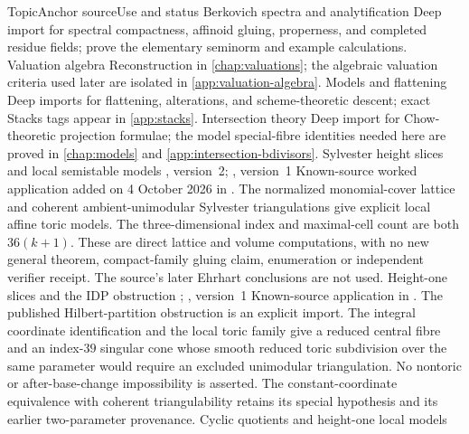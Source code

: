\begin{AppLProvenanceLedger}{Topic}{Anchor source}{Use and status}
\AppLProvenanceRecord
  {Berkovich spectra and analytification}
  {\cite{Berk12}}
  {Deep import for spectral compactness, affinoid gluing, properness, and
   completed residue fields; 
   prove the elementary seminorm
   and example calculations.}
\AppLProvenanceRecord
  {Valuation algebra}
  {\cite{ZariskiSamuelII,Berk12}}
  {Reconstruction in \cref{chap:valuations}; the algebraic valuation criteria
   used later are isolated in \cref{app:valuation-algebra}.}
\AppLProvenanceRecord
  {Models and flattening}
  {\cite{RaynaudGruson1971,deJong1996,stacks-project}}
  {Deep imports for flattening, alterations, and scheme-theoretic
   descent; exact Stacks tags appear in \cref{app:stacks}.}
\AppLProvenanceRecord
  {Intersection theory}
  {\cite{Ful}}
  {Deep import for Chow-theoretic projection formulae; the model
   special-fibre identities needed here are proved in \cref{chap:models} and
   \cref{app:intersection-bdivisors}.}
\AppLProvenanceRecord
  {Sylvester height slices and local semistable models}
  {\cite[Proposition~3.7]{AmbroCyclicV2}, version~2;
   \cite[Theorem~3.5]{CCJP26Sylvester}, version~1}
  {Known-source worked application added on 4 October 2026 in
   . The normalized monomial-cover lattice
   and coherent ambient-unimodular Sylvester triangulations give explicit
   local affine toric models. The three-dimensional index and maximal-cell
   count are both $36(k+1)$. These are direct lattice and volume
   computations, with no new general theorem, compact-family gluing
   claim, enumeration or independent verifier receipt. The source's
   later Ehrhart conclusions are not used.}
\AppLProvenanceRecord
  {Height-one slices and the IDP obstruction}
  {\cite[Example~10]{FZ99Hilbert};
   \cite[Theorem~1.4 and Examples~6.4--6.5]{LTTZ26HNF}, version~1}
  {Known-source application in .
   The published Hilbert-partition obstruction is an explicit import.
   The integral coordinate identification and the local toric family
   give a reduced central fibre and an index-$39$ singular cone whose
   smooth reduced toric subdivision over the same parameter would
   require an excluded unimodular triangulation. No nontoric or
   after-base-change impossibility is asserted. The constant-coordinate
   equivalence with coherent triangulability retains its special
   hypothesis and its earlier two-parameter provenance.}
\AppLProvenanceRecord
  {Cyclic quotients and height-one local models}

\end{AppLProvenanceLedger}
